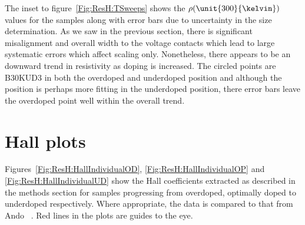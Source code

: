 The inset to figure~\ref{Fig:ResH:TSweeps} shows the $\rho(\unit{300}{\kelvin})$ values for the samples along with error bars due to uncertainty in the size determination. As we saw in the previous section, there is significant misalignment and overall width to the voltage contacts which lead to large systematic errors which affect scaling only. Nonetheless, there appears to be an downward trend in resistivity as doping is increased. The circled points are B30KUD3 in both the overdoped and underdoped position and although the position is perhaps more fitting in the underdoped position, there error bars leave the overdoped point well within the overall trend.




\section{Hall plots}

Figures~\ref{Fig:ResH:HallIndividualOD}, \ref{Fig:ResH:HallIndividualOP} and \ref{Fig:ResH:HallIndividualUD} show the Hall coefficients extracted as described in the methods section for samples progressing from overdoped, optimally doped to underdoped respectively. Where appropriate, the data is compared to that from Ando \etal~\cite{Ando1999}. Red lines in the plots are guides to the eye.

